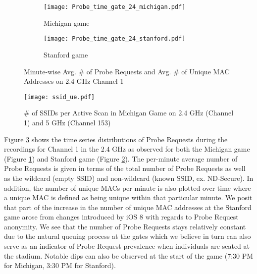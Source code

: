\documentclass[conference]{IEEEtran}
\begin{document}
\begin{figure}

\centering

\begin{subfigure}[b]{0.45\textwidth}

\texttt{[image: Probe\_time\_gate\_24\_michigan.pdf]}

\caption{Michigan game}
\label{Graph:MichiganTS}
\end{subfigure}

\begin{subfigure}[b]{0.45\textwidth}

\texttt{[image: Probe\_time\_gate\_24\_stanford.pdf]}

\caption{Stanford game}

\label{Graph:StanfordTS}

\end{subfigure}

\caption{Minute-wise Avg. \# of Probe Requests and Avg. \# of Unique MAC Addresses on 2.4 GHz Channel 1} 

\label{time_series}

\end{figure}

\begin{figure}
\centering
\texttt{[image: ssid\_ue.pdf]}
\caption{\# of SSIDs per Active Scan in Michigan Game on 2.4 GHz (Channel 1) and 5 GHz (Channel 153)}
\label{Graph:SSID_UE}
\end{figure}

Figure \ref{time_series} shows the time series distributions of Probe Requests during the recordings for Channel 1 in the 2.4 GHz as observed for both the Michigan game (Figure \ref{Graph:MichiganTS}) and Stanford game (Figure \ref{Graph:StanfordTS}).  The per-minute average number of Probe Requests is given in terms of the total number of Probe Requests as well as the wildcard (empty SSID) and non-wildcard (known SSID, ex. ND-Secure).  In addition, the number of unique MACs per minute is also plotted over time where a unique MAC is defined as being unique within that particular minute.  We posit that part of the increase in the number of unique MAC addresses at the Stanford game arose from changes introduced by iOS 8 with regards to Probe Request anonymity.  We see that the number of Probe Requests stays relatively constant due to the natural queuing process at the gates which we believe in turn can also serve as an indicator of Probe Request prevalence when individuals are seated at the stadium.  Notable dips can also be observed at the start of the game (7:30 PM for Michigan, 3:30 PM for Stanford).        
\end{document}
